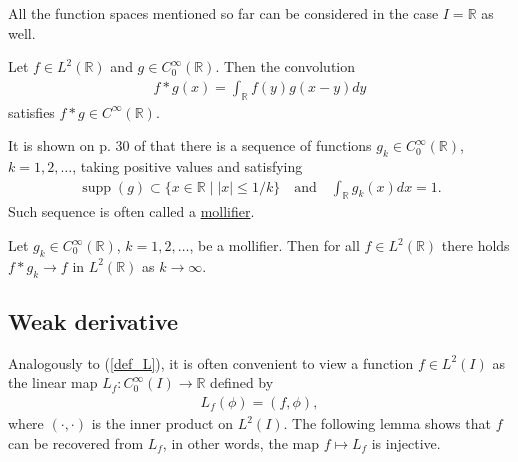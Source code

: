 \documentclass[12pt,oneside]{amsart}
\def\R{\mathbb R}
\DeclareMathOperator{\supp}{supp}
\begin{document}
All the function spaces mentioned so far can be considered in the case $I = \R$ as well.

\begin{theorem}\label{th_smoothing}
Let $f \in L^2(\R)$ and $g \in C_0^\infty(\R)$. Then the convolution
    \begin{align*}
f * g(x) = \int_\R f(y) g(x - y) dy
    \end{align*}
satisfies $f * g \in C^\infty(\R)$.
\end{theorem}

It is shown on p. 30 of \cite{Holopainen} that 
there is a sequence of functions $g_k \in C_0^\infty(\R)$, $k=1,2,\dots$, taking positive values and satisfying 
    \begin{align}\label{def_mollifier}
\supp(g) \subset \{x \in \R \mid |x| \le 1/k\}
\quad\text{and}\quad
\int_\R g_k(x) dx = 1.
    \end{align}
Such sequence is often called a \href{https://en.wikipedia.org/wiki/Mollifier}{mollifier}.

\begin{theorem}\label{th_L2_density}
Let $g_k \in C_0^\infty(\R)$, $k=1,2,\dots$,
be a mollifier. Then for all $f \in L^2(\R)$ there holds $f * g_k \to f$ in $L^2(\R)$ as $k \to \infty$. 
\end{theorem}

\subsection{Weak derivative}

Analogously to (\ref{def_L}), it is often convenient to view a function $f \in L^2(I)$ 
as the linear map $L_f : C_0^\infty(I) \to \R$ defined by 
    \begin{align*}
L_f(\phi) = (f, \phi),
    \end{align*}
where $(\cdot,\cdot)$ is the inner product on $L^2(I)$.
The following lemma shows that $f$ can be recovered from $L_f$, in other words, the map $f \mapsto L_f$ is injective. 
\end{document}
